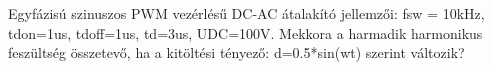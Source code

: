 \begin{example}

Egyfázisú szinuszos PWM vezérlésű DC-AC átalakító jellemzői:
fsw = 10kHz, tdon=1us, tdoff=1us, td=3us, UDC=100V.
Mekkora a harmadik harmonikus feszültség összetevő, ha a kitöltési tényező:
d=0.5*sin(wt) szerint változik?



\tcbline
\vspace{1mm}

\solution

\end{example}